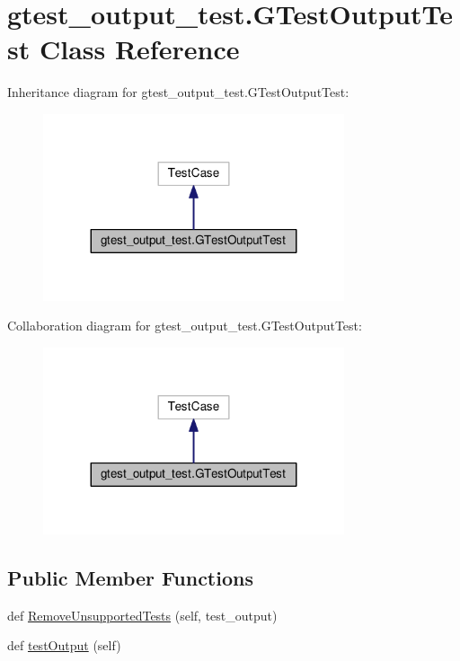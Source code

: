 \hypertarget{classgtest__output__test_1_1GTestOutputTest}{}\section{gtest\+\_\+output\+\_\+test.\+G\+Test\+Output\+Test Class Reference}
\label{classgtest__output__test_1_1GTestOutputTest}


Inheritance diagram for gtest\+\_\+output\+\_\+test.\+G\+Test\+Output\+Test\+:\nopagebreak
\begin{figure}[H]
\begin{center}
\leavevmode
\includegraphics[width=251pt]{classgtest__output__test_1_1GTestOutputTest__inherit__graph}
\end{center}
\end{figure}


Collaboration diagram for gtest\+\_\+output\+\_\+test.\+G\+Test\+Output\+Test\+:\nopagebreak
\begin{figure}[H]
\begin{center}
\leavevmode
\includegraphics[width=251pt]{classgtest__output__test_1_1GTestOutputTest__coll__graph}
\end{center}
\end{figure}
\subsection*{Public Member Functions}
\begin{DoxyCompactItemize}
\item 
def \hyperlink{classgtest__output__test_1_1GTestOutputTest_a63f62268f795adfc5ca91514dbec2873}{Remove\+Unsupported\+Tests} (self, test\+\_\+output)
\item 
def \hyperlink{classgtest__output__test_1_1GTestOutputTest_a1e6b96f68c5bcb8271de3208fa7f9f64}{test\+Output} (self)
\end{DoxyCompactItemize}



